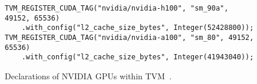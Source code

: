 
\begin{figure}[H]
    \centering
\begin{verbatim}
TVM_REGISTER_CUDA_TAG("nvidia/nvidia-h100", "sm_90a", 49152, 65536)
    .with_config("l2_cache_size_bytes", Integer(52428800));
TVM_REGISTER_CUDA_TAG("nvidia/nvidia-a100", "sm_80", 49152, 65536)
    .with_config("l2_cache_size_bytes", Integer(41943040));
\end{verbatim}
\caption{
Declarations of NVIDIA GPUs
  within TVM~\cite{tvmgpudecls}.
}
    \label{fig:intro:tvm-gpu-decls}
\end{figure}
